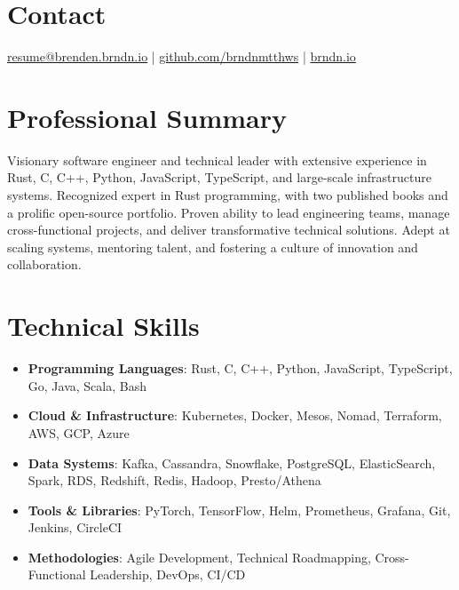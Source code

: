 \documentclass[margin,line]{resume}
\begin{document}
 
\begin{resume}

\section{Contact} \href{mailto:resume@brenden.brndn.io}{resume@brenden.brndn.io} | \href{https://github.com/brndnmtthws}{github.com/brndnmtthws} | \href{https://brndn.io}{brndn.io}

\vspace{10pt}

\section{Professional Summary}
Visionary software engineer and technical leader with extensive experience in Rust, C, C++, Python, JavaScript, TypeScript, and large-scale infrastructure systems. Recognized expert in Rust programming, with two published books and a prolific open-source portfolio. Proven ability to lead engineering teams, manage cross-functional projects, and deliver transformative technical solutions. Adept at scaling systems, mentoring talent, and fostering a culture of innovation and collaboration.

\vspace{10pt}

\section{Technical Skills}
\begin{itemize}[leftmargin=0.5cm]
    \item \textbf{Programming Languages}: Rust, C, C++, Python, JavaScript, TypeScript, Go, Java, Scala, Bash
    \item \textbf{Cloud \& Infrastructure}: Kubernetes, Docker, Mesos, Nomad, Terraform, AWS, GCP, Azure
    \item \textbf{Data Systems}: Kafka, Cassandra, Snowflake, PostgreSQL, ElasticSearch, Spark, RDS, Redshift, Redis, Hadoop, Presto/Athena
    \item \textbf{Tools \& Libraries}: PyTorch, TensorFlow, Helm, Prometheus, Grafana, Git, Jenkins, CircleCI
    \item \textbf{Methodologies}: Agile Development, Technical Roadmapping, Cross-Functional Leadership, DevOps, CI/CD
\end{itemize}


\end{resume}
\end{document}
